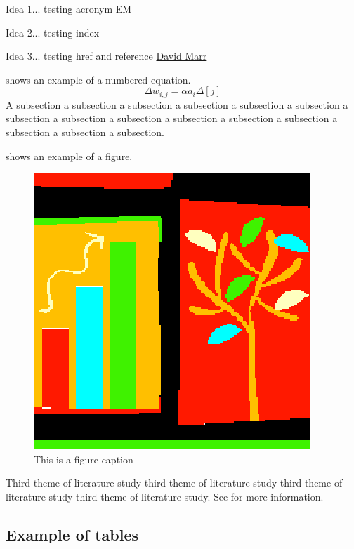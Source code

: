 \begin{compactitem}
\item Idea 1... testing acronym \ac{EM}
\item Idea 2... testing index 
\item Idea 3... testing href and reference
\href{http://en.wikipedia.org/wiki/David_Marr_(neuroscientist)}{David Marr}
~\cite{marr_aa_2010}
\end{compactitem}


 shows an example of a numbered equation.
\begin{equation}
  \Delta w_{i,j} = \alpha a_i \Delta[j]  \label{eqn:example}
\end{equation}
A subsection a subsection a subsection a subsection a subsection a
subsection a subsection a subsection a subsection a subsection a
subsection a subsection a subsection a subsection a subsection.
\nocite{dellaert_spieits_1997}

 shows an example of a figure.
\begin{figure}[!ht]
  \centering
  \includegraphics[width=0.4\linewidth]{figures/figure1}
  \caption{This is a figure caption}
  \label{fig:example}
\end{figure}

Third theme of literature study third theme of literature study third
theme of literature study third theme of literature study. See
 for more information.

\subsection{Example of tables}

